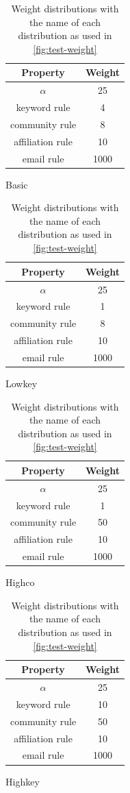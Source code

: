 \begin{table}[ht]
	\begin{minipage}[b]{0.5\linewidth}\centering
		\begin{tabular}{|c|c|}
			\hline
			\bfseries{Property} & \bfseries{Weight} \\
			\hline
			$\alpha$ & 25 \\
			\hline
			keyword rule & 4\\
			\hline
			community rule & 8\\
			\hline
			affiliation rule & 10\\
			\hline
			email rule & 1000\\
			\hline
		\end{tabular}
		\caption{Basic}
	\end{minipage}
	\begin{minipage}[b]{0.5\linewidth}
		\centering
		\begin{tabular}{|c|c|}
			\hline
			\bfseries{Property} & \bfseries{Weight} \\
			\hline
			$\alpha$ & 25 \\
			\hline
			keyword rule & 1\\
			\hline
			community rule & 8\\
			\hline
			affiliation rule & 10\\
			\hline
			email rule & 1000\\
			\hline
		\end{tabular}
		\caption{Lowkey}
	\end{minipage}
	\begin{minipage}[b]{0.5\linewidth}\centering
		\begin{tabular}{|c|c|}
			\hline
			\bfseries{Property} & \bfseries{Weight} \\
			\hline
			$\alpha$ & 25 \\
			\hline
			keyword rule & 1\\
			\hline
			community rule & 50\\
			\hline
			affiliation rule & 10\\
			\hline
			email rule & 1000\\
			\hline
		\end{tabular}
		\caption{Highco}
	\end{minipage}
	\begin{minipage}[b]{0.5\linewidth}
		\centering
		\begin{tabular}{|c|c|}
			\hline
			\bfseries{Property} & \bfseries{Weight} \\
			\hline
			$\alpha$ & 25 \\
			\hline
			keyword rule & 10\\
			\hline
			community rule & 50\\
			\hline
			affiliation rule & 10\\
			\hline
			email rule & 1000\\
			\hline
		\end{tabular}
		\caption{Highkey}
		\label{table:highkey}
	\end{minipage}
	\caption{Weight distributions with the name of each distribution as used in \autoref{fig:test-weight}}
	\label{table:distributions}
\end{table}

